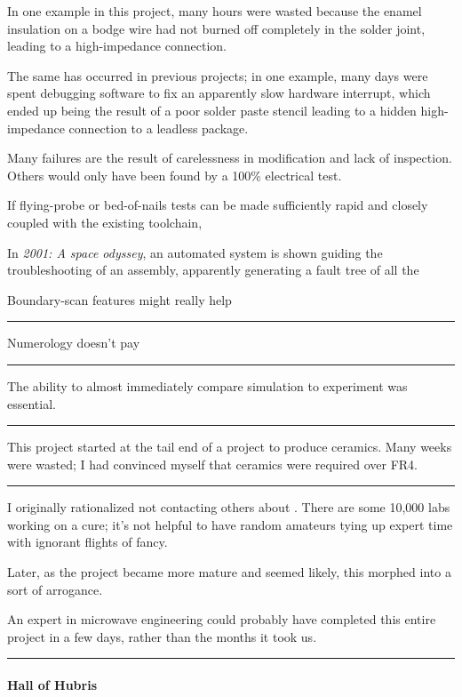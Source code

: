 \documentclass[paper.tex]{subfiles}
\begin{document}
In one example in this project, many hours were wasted because the enamel insulation on a bodge wire had not burned off completely in the solder joint, leading to a high-impedance connection.

The same has occurred in previous projects; in one example, many days were spent debugging software to fix an apparently slow hardware interrupt, which ended up being the result of a poor solder paste stencil leading to a hidden high-impedance connection to a leadless package.

Many failures are the result of carelessness in modification and lack of inspection. Others would only have been found by a 100\% electrical test.

If flying-probe or bed-of-nails tests can be made sufficiently rapid and closely coupled with the existing toolchain, 

In {\it 2001: A space odyssey}, an automated system is shown guiding the troubleshooting of an assembly, apparently generating a fault tree of all the 

Boundary-scan features might really help 

\rule{\linewidth}{0.2pt}

Numerology doesn't pay

\rule{\linewidth}{0.2pt}

The ability to almost immediately compare simulation to experiment was essential.

\rule{\linewidth}{0.2pt}

This project started at the tail end of a project to produce ceramics. Many weeks were wasted; I had convinced myself that ceramics were required over FR4. 

\rule{\linewidth}{0.2pt}

I originally rationalized not contacting others about . There are some 10,000 labs working on a cure; it's not helpful to have random amateurs tying up expert time with ignorant flights of fancy. 

Later, as the project became more mature and seemed likely, this morphed into a sort of arrogance.

An expert in microwave engineering could probably have completed this entire project in a few days, rather than the months it took us.

\rule{\linewidth}{0.2pt}

\paragraph{Hall of Hubris} \
\end{document}
